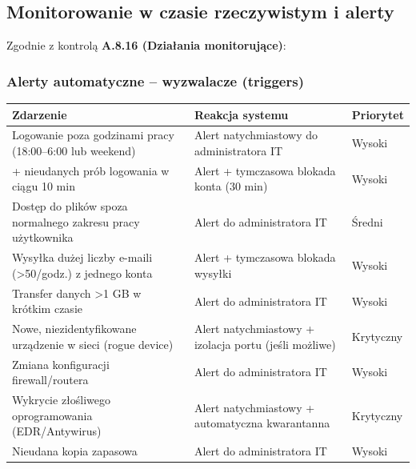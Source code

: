\documentclass[12pt,a4paper]{article}
\begin{document}
\subsection{Monitorowanie w czasie rzeczywistym i alerty}\label{monitorowanie-w-czasie-rzeczywistym-i-alerty}

Zgodnie z kontrolą \textbf{A.8.16 (Działania monitorujące)}:

\subsubsection{Alerty automatyczne -- wyzwalacze (triggers)}\label{alerty-automatyczne-wyzwalacze-triggers}

\begin{longtable}{@{}>{\raggedright\arraybackslash}p{}>{\raggedright\arraybackslash}p{}>{\raggedright\arraybackslash}p{}@{}}
\toprule\noalign{}
Zdarzenie & Reakcja systemu & Priorytet \\
\midrule\noalign{}
\endhead
\bottomrule\noalign{}
\endlastfoot
Logowanie poza godzinami pracy (18:00--6:00 lub weekend) & Alert natychmiastowy do administratora IT & Wysoki \\
5+ nieudanych prób logowania w ciągu 10 min & Alert + tymczasowa blokada konta (30 min) & Wysoki \\
Dostęp do plików spoza normalnego zakresu pracy użytkownika & Alert do administratora IT & Średni \\
Wysyłka dużej liczby e-maili (\textgreater{}50/godz.) z jednego konta & Alert + tymczasowa blokada wysyłki & Wysoki \\
Transfer danych \textgreater{}1 GB w krótkim czasie & Alert do administratora IT & Wysoki \\
Nowe, niezidentyfikowane urządzenie w sieci (rogue device) & Alert natychmiastowy + izolacja portu (jeśli możliwe) & Krytyczny \\
Zmiana konfiguracji firewall/routera & Alert do administratora IT & Wysoki \\
Wykrycie złośliwego oprogramowania (EDR/Antywirus) & Alert natychmiastowy + automatyczna kwarantanna & Krytyczny \\
Nieudana kopia zapasowa & Alert do administratora IT & Wysoki \\
\end{longtable}
\end{document}
